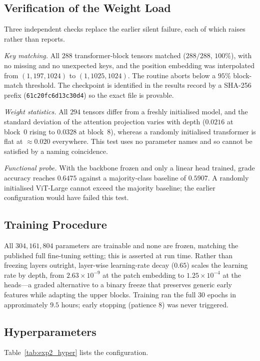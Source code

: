 \documentclass[journal,twoside,web]{ieeecolor}
\begin{document}
\subsection{Verification of the Weight Load}
Three independent checks replace the earlier silent failure, each of which raises rather
than reports.

\emph{Key matching.} All $288$ transformer-block tensors matched
($288/288$, $100\%$), with no missing and no unexpected keys, and the position embedding
was interpolated from $(1,197,1024)$ to $(1,1025,1024)$. The routine aborts below a $95\%$
block-match threshold. The checkpoint is identified in the results record by a SHA-256
prefix (\texttt{61c20fc6d13c30d4}) so the exact file is provable.

\emph{Weight statistics.} All $294$ tensors differ from a freshly initialised model, and
the standard deviation of the attention projection varies with depth
($0.0216$ at block~0 rising to $0.0328$ at block~8), whereas a randomly initialised
transformer is flat at $\approx0.020$ everywhere. This test uses no parameter names and
so cannot be satisfied by a naming coincidence.

\emph{Functional probe.} With the backbone frozen and only a linear head trained, grade
accuracy reaches $0.6475$ against a majority-class baseline of $0.5907$. A randomly
initialised ViT-Large cannot exceed the majority baseline; the earlier configuration
would have failed this test.

\subsection{Training Procedure}
All $304{,}161{,}804$ parameters are trainable and none are frozen, matching the
published full fine-tuning setting; this is asserted at run time. Rather than freezing
layers outright, layer-wise learning-rate decay ($0.65$) scales the learning rate by
depth, from $2.63\times10^{-9}$ at the patch embedding to $1.25\times10^{-4}$ at the
heads---a graded alternative to a binary freeze that preserves generic early features
while adapting the upper blocks. Training ran the full $30$ epochs in approximately
$9.5$ hours; early stopping (patience $8$) was never triggered.

\subsection{Hyperparameters}
Table~\ref{tab:exp2_hyper} lists the configuration.
\end{document}
